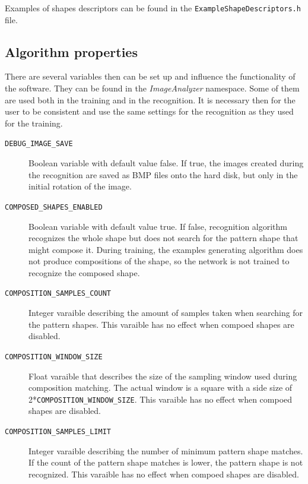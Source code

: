 \begin{description}
\begin{description}
Examples of shapes descriptors can be found in the \texttt{ExampleShapeDescriptors.h} file.

\subsection{Algorithm properties}
There are several variables then can be set up and influence the functionality of the software. They can be found in the \emph{ImageAnalyzer} namespace. Some of them are used both in the training and in the recognition. It is necessary then for the user to be consistent and use the same settings for the recognition as they used for the training.

\begin{description}
\item[\texttt{DEBUG\_IMAGE\_SAVE}] Boolean variable with default value false. If true, the images created during the recognition are saved as BMP files onto the hard disk, but only in the initial rotation of the image.

\item[\texttt{COMPOSED\_SHAPES\_ENABLED}] Boolean variable with default value true. If false, recognition algorithm recognizes the whole shape but does not search for the pattern shape that might compose it. During training, the examples generating algorithm does not produce compositions of the shape, so the network is not trained to recognize the composed shape.

\item[\texttt{COMPOSITION\_SAMPLES\_COUNT}] Integer varaible describing the amount of samples taken when searching for the pattern shapes. This varaible has no effect when compoed shapes are disabled.

\item[\texttt{COMPOSITION\_WINDOW\_SIZE}] Float varaible that describes the size of the sampling window used during composition matching. The actual window is a square with a side size of 2*\texttt{COMPOSITION\_WINDOW\_SIZE}. This varaible has no effect when compoed shapes are disabled.

\item[\texttt{COMPOSITION\_SAMPLES\_LIMIT}] Integer varaible describing the number of minimum pattern shape matches. If the count of the pattern shape matches is lower, the pattern shape is not recognized. This varaible has no effect when compoed shapes are disabled.


\end{description}
\end{description}
\end{description}

